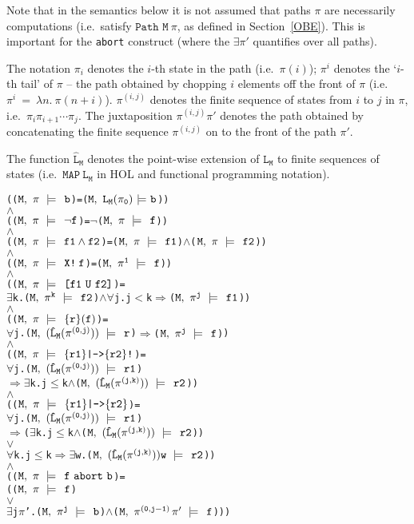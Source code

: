 \documentclass{llncs}
\newcommand{\And}{\(\wedge\)}
\newcommand{\Or}{\(\vee\)}
\newcommand{\Imp}{\(\Rightarrow\)}
\newcommand{\Not}{\(\neg\)}
\newcommand{\Forall}{\(\forall\)}
\newcommand{\Exists}{\(\exists\)}
\newcommand{\pathCat}[2]{#1\hspace*{0.5mm}#2}
\newcommand{\Leq}{\(\leq\)}
\newcommand{\Le}{\(<\)}
\renewcommand{\Pi}{\(\pi\)}
\newcommand{\BSem}[3]{(\(\tt#1,~#2~{\models}~#3\))}
\newcommand{\SSem}[4]{(\(\tt{#1,~#2~\models^{\hspace*{-2.3mm}\raisebox{1mm}{\tt#3}}~#4}\))}
\renewcommand{\c}{{\hspace*{2.5mm}}}
\newcommand{\FSem}[4]{(\(\tt{#1,~#2~\models^{\hspace*{-2.3mm}\raisebox{1mm}{\tt#3}}~#4}\))}
\newcommand{\FBool}[1]{#1}
\newcommand{\fNot}[1]{\neg#1}
\newcommand{\restN}[2]{#1^{#2}}
\newcommand{\pathEl}[2]{#1_{#2}}
\newcommand{\pathSeg}[2]{#1^{#2}}
\newcommand{\lHat}[1]{\hat{\texttt{L}}_{#1}}
\newcommand{\lNoHat}[1]{{\texttt{L}}_{#1}}
\newcommand{\fAnd}[2]{#1 \wedge #2}
\newcommand{\fNext}[1]{\texttt{X!}\hspace*{0.8mm}#1}
\newcommand{\fUntil}[2]{\texttt{[}#1~\texttt{U}~#2\texttt{]}}
\newcommand{\fSuffixImp}[2]{\{#1\}(#2)}
\newcommand{\fStrongImp}[2]{\{#1\}\texttt{|->}\{#2\}\texttt{!}}
\newcommand{\fWeakImp}[2]{\{#1\}\texttt{|->}\{#2\}}
\newcommand{\fAbort}[2]{#1~\texttt{abort}~#2}
\newcommand\Hol{HOL\xspace}
\renewcommand{\t}[1]{\texttt{#1}}
\begin{document}
Note that in the semantics below it is not assumed that paths $\pi$ are necessarily computations
(i.e.~satisfy $\texttt{Path~M}~\pi$, as defined in Section~\ref{OBE}). This is important
for the \t{abort} construct (where the $\exists\pi'$ quantifies over all paths).

The notation $\pi_i$ denotes the $i$-th state in the path (i.e.~$\pi(i)$);
$\pi^i$ denotes the `$i$-th tail' of $\pi$ -- the path obtained
by chopping $i$ elements off the front of $\pi$ (i.e. $\pi^i~=~\lambda n.~\pi(n{+}i)$).
$\pi^{(i,j)}$ denotes the finite sequence of states from $i$ to $j$ in $\pi$,
i.e.~$\pi_i\pi_{i{+}1}\cdots\pi_j$. The juxtaposition
$\pi^{(i,j)}\pi'$ denotes the path obtained by concatenating the finite sequence
$\pi^{(i,j)}$ on to the front of the path $\pi'$. 

The function $\hat{\t{L}}_{\t{M}}$ denotes the point-wise extension of
$\t{L}_{\t{M}}$ to finite sequences of states
(i.e.~$\texttt{MAP}~\t{L}_{\t{M}}$ in \Hol and functional programming notation).



{\begin{alltt}

    ({\FSem{M}{{\pi}}{{\c}}{\FBool{b}}} = {\BSem{M}{\lNoHat{M}(\pathEl{{\pi}}{0})}{b}})
    {\And}
    ({\FSem{M}{{\pi}}{{\c}}{\fNot{f}}} = {\Not}{\FSem{M}{{\pi}}{\c}{f}})
    {\And}
    ({\FSem{M}{{\pi}}{{\c}}{\fAnd{f1}{f2}}} = {\FSem{M}{\pi}{{\c}}{f1}} {\And} {\FSem{M}{\pi}{{\c}}{f2}})
    {\And}
    ({\FSem{M}{{\pi}}{{\c}}{\fNext{f}}} = {\FSem{M}{\restN{{\pi}}{1}}{{\c}}{f}})
    {\And}
    ({\FSem{M}{{\pi}}{{\c}}{\fUntil{f1}{f2}}} = 
      {\Exists}k. {\FSem{M}{\restN{{\pi}}{k}}{\c}{f2}} {\And} {\Forall}j. j \Le k \Imp {\FSem{M}{\restN{{\pi}}{j}}{{\c}}{f1}})
    {\And}
    ({\FSem{M}{{\pi}}{{\c}}{\fSuffixImp{r}{f}}} = 
      {\Forall}j. \SSem{M}{(\lHat{M} (\pathSeg{\pi}{(0,j)}))}{\c}{r} {\Imp} {\FSem{M}{\restN{{\pi}}{j}}{{\c}}{f}})
    {\And}
    ({\FSem{M}{{\pi}}{{\c}}{\fStrongImp{r1}{r2}}} = 
      {\Forall}j. \SSem{M}{(\lHat{M} (\pathSeg{\pi}{(0,j)}))}{\c}{r1} 
          {\Imp} {\Exists}k. j \Leq k \And \SSem{M}{(\lHat{M} (\pathSeg{\pi}{(j,k)}))}{\c}{r2})
    {\And}
    ({\FSem{M}{{\pi}}{{\c}}{\fWeakImp{r1}{r2}}} = 
      {\Forall}j. \SSem{M}{(\lHat{M} (\pathSeg{\pi}{(0,j)}))}{\c}{r1} 
          \Imp ({\Exists}k. j \Leq k \And \SSem{M}{(\lHat{M} (\pathSeg{\pi}{(j,k)}))}{\c}{r2})
             \Or
             {\Forall}k. j \Leq k \Imp {\Exists}w. \SSem{M}{(\lHat{M} (\pathSeg{\pi}{(j,k)}))w}{\c}{r2})
    {\And}
    ({\FSem{M}{{\pi}}{{\c}}{\fAbort{f}{b}}} =
      ({\FSem{M}{\pi}{{\c}}{f }}
       {\Or}
       {\Exists}j {\Pi}'. {\FSem{M}{\restN{{\pi}}{j}}{\c}{{\FBool{b}}}} {\And} {\FSem{M}{\pathCat{\pathSeg{\pi}{(0,j-1)}}{{\pi}'}}{{\c}}{f}}))

\end{alltt}}
\end{document}
